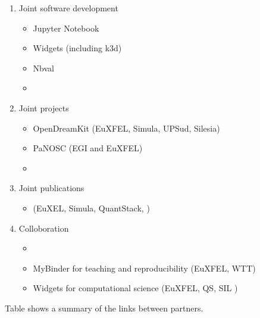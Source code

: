 \begin{enumerate}
\item Joint software development
  \begin{itemize}
  \item Jupyter Notebook 
  \item Widgets (including k3d)
  \item Nbval
  \item {}
  \end{itemize}

\item Joint projects
  \begin{itemize}
  \item OpenDreamKit (EuXFEL, Simula, UPSud, Silesia)
  \item PaNOSC (EGI and EuXFEL)
  \item {}
  \end{itemize}
\item Joint publications
  \begin{itemize}
  \item \cite{Kluyver2017} (EuXEL, Simula, QuantStack, )
  \end{itemize}

\item Colloboration
  \begin{itemize}
  \item {}

  \item MyBinder for teaching and reproducibility (EuXFEL, WTT)
  \item Widgets for computational science (EuXFEL, QS, SIL )
  \end{itemize}
\end{enumerate}

Table  shows a summary of the links
between partners.



